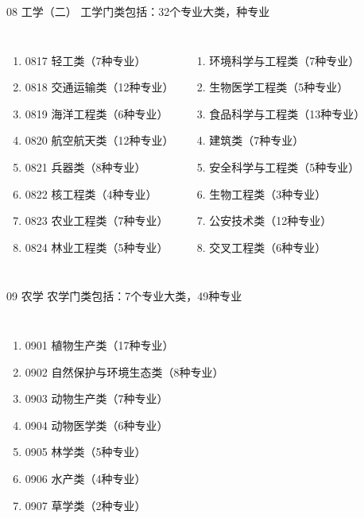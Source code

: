 \documentclass[aspectratio=169]{ctexbeamer} %
\begin{document}
\begin{frame}[t]{08 工学（二）}
工学门类包括：32个专业大类，种专业 \\

\begin{spacing}{1.0} %
\begin{columns}
{\large
\begin{enumerate}[label={\arabic*.}, start=17]
\item 0817 轻工类（7种专业）
\item 0818 交通运输类（12种专业）
\item 0819 海洋工程类（6种专业）
\item 0820 航空航天类（12种专业）
\item 0821 兵器类（8种专业）
\item 0822 核工程类（4种专业）
\item 0823 农业工程类（7种专业）
\item 0824 林业工程类（5种专业）
\end{enumerate} 
}
{\large
\begin{enumerate}[label={\arabic*.},start=25]
\item 环境科学与工程类（7种专业）
\item 生物医学工程类（5种专业）
\item 食品科学与工程类（13种专业）
\item 建筑类（7种专业）
\item 安全科学与工程类（5种专业）
\item 生物工程类（3种专业）
\item 公安技术类（12种专业）
\item 交叉工程类（6种专业）
\end{enumerate} 
}
\end{columns}
\end{spacing}
\end{frame}

\begin{frame}[t]{09 农学}
农学门类包括：7个专业大类，49种专业
\begin{spacing}{1.2} %
\begin{columns}
{\large
\begin{enumerate}[label={\arabic*.}]
\item 0901 植物生产类（17种专业）
\item 0902 自然保护与环境生态类（8种专业）
\item 0903 动物生产类（7种专业）
\item 0904 动物医学类（6种专业）
\item 0905 林学类（5种专业）
\item 0906 水产类（4种专业）
\item 0907 草学类（2种专业）
\end{enumerate} 
}
\end{columns}
\end{spacing}
\end{frame}
\end{document}
